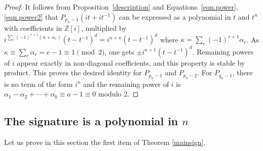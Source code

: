 \documentclass{amsart}
\newcommand{\Z}{\mathbb{Z}}
\theoremstyle{definition}
\begin{document}
\begin{proof}
    It follows from Proposition~\ref{description} and Equations~\eqref{eqn.power}, \eqref{eqn.power2} that $P_{p_n-1}(it+it^{-1})$ can be expressed as a polynomial in $t$ and $t^n$ with coefficients in $\Z[i]$, multiplied by $i^{\sum_{r}(-1)^{r+1}(n+\alpha_r)}(t-t^{-1})^d=i^{n+\kappa}(t-t^{-1})^d$ where $\kappa=\sum_r (-1)^{r+1}\alpha_r$. As $\kappa\equiv\sum_r \alpha_r=c-1\equiv 1 \pmod{2}$, one gets $\pm i^{n+1}(t-t^{-1})^d$. Remaining powers of $i$ appear exactly in non-diagonal coefficients, and this property is stable by product.
%
    This proves the desired identity for $P_{p_n-1}$ and $P_{p_n-2}$. For $P_{q_n-1}$, there is no term of the form $i^n$ and the remaining power of $i$ is $\alpha_1-\alpha_2+\cdots+\alpha_b\equiv a-1\equiv 0$ modulo 2.
\end{proof}

\subsection{The signature is a polynomial in $n$}
Let us prove in this section the first item of Theorem \ref{mainsign}. 
\end{document}
